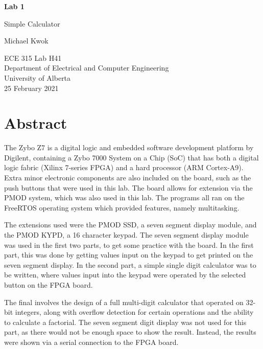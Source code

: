 \documentclass{article}
\begin{document}
\begin{titlepage}
    \begin{center}
        \vspace*{1cm}

        \textbf{\Large{Lab 1}}

        \vspace{0.5cm}

        \LARGE{Simple Calculator}
        \vspace{1.5cm}

        Michael Kwok

        \vfill
        \Large{ECE 315 Lab H41\\
            Department of Electrical and Computer Engineering\\
            University of Alberta\\
            25 February 2021}
    \end{center}
\end{titlepage}
\newpage
\tableofcontents
\thispagestyle{empty}
\newpage
\section{Abstract}
The Zybo Z7 is a digital logic and embedded software development platform by Digilent, containing a Zybo 7000 System on a Chip (SoC) that has both a digital logic fabric (Xilinx 7-series FPGA) and a hard processor (ARM Cortex-A9). Extra minor electronic components are also included on the board, such as the push buttons that were used in this lab. The board allows for extension via the PMOD system, which was also used in this lab. The programs all ran on the FreeRTOS operating system which provided features, namely multitasking.

The extensions used were the PMOD SSD, a seven segment display module, and the PMOD KYPD, a 16 character keypad. The seven segment display module was used in the first two parts, to get some practice with the board. In the first part, this was done by getting values input on the keypad to get printed on the seven segment display. In the second part, a simple single digit calculator was to be written, where values input into the keypad were operated by the selected button on the FPGA board.

The final involves the design of a full multi-digit calculator that operated on 32-bit integers, along with overflow detection for certain operations and the ability to calculate a factorial. The seven segment digit display was not used for this part, as there would not be enough space to show the result. Instead, the results were shown via a serial connection to the FPGA board.
\end{document}
